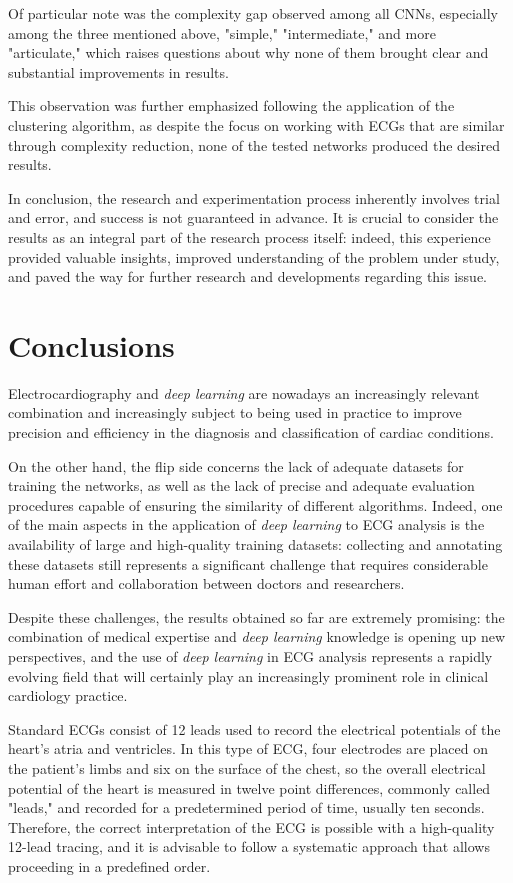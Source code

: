 \documentclass[12pt,italian]{report}
\begin{document}
Of particular note was the complexity gap observed among all CNNs, especially among the three mentioned above, "simple," "intermediate," and more "articulate," which raises questions about why none of them brought clear and substantial improvements in results.

This observation was further emphasized following the application of the clustering algorithm, as despite the focus on working with ECGs that are similar through complexity reduction, none of the tested networks produced the desired results.

In conclusion, the research and experimentation process inherently involves trial and error, and success is not guaranteed in advance. It is crucial to consider the results as an integral part of the research process itself: indeed, this experience provided valuable insights, improved understanding of the problem under study, and paved the way for further research and developments regarding this issue.

\chapter{Conclusions}
\label{chap:conclusions}

Electrocardiography and \textit{deep learning} are nowadays an increasingly relevant combination and increasingly subject to being used in practice to improve precision and efficiency in the diagnosis and classification of cardiac conditions.

On the other hand, the flip side concerns the lack of adequate datasets for training the networks, as well as the lack of precise and adequate evaluation procedures capable of ensuring the similarity of different algorithms. Indeed, one of the main aspects in the application of \textit{deep learning} to ECG analysis is the availability of large and high-quality training datasets: collecting and annotating these datasets still represents a significant challenge that requires considerable human effort and collaboration between doctors and researchers.

Despite these challenges, the results obtained so far are extremely promising: the combination of medical expertise and \textit{deep learning} knowledge is opening up new perspectives, and the use of \textit{deep learning} in ECG analysis represents a rapidly evolving field that will certainly play an increasingly prominent role in clinical cardiology practice.

Standard ECGs consist of 12 leads used to record the electrical potentials of the heart's atria and ventricles. In this type of ECG, four electrodes are placed on the patient's limbs and six on the surface of the chest, so the overall electrical potential of the heart is measured in twelve point differences, commonly called "leads," and recorded for a predetermined period of time, usually ten seconds. Therefore, the correct interpretation of the ECG is possible with a high-quality 12-lead tracing, and it is advisable to follow a systematic approach that allows proceeding in a predefined order.
\end{document}
